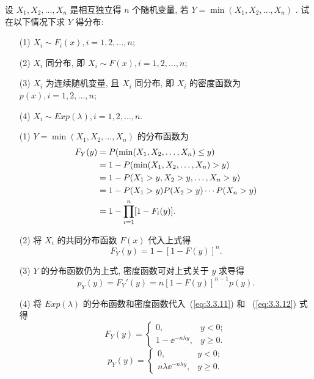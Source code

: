    \begin{example}[最小值分布]\label{exam:3.3.5}
   	设 $X_1,X_2,\ldots,X_n$ 是相互独立得 $n$ 个随机变量, 若 $Y=\min(X_1,X_2,\ldots,X_n)$ . 试在以下情况下求 $Y$ 得分布:
   	\begin{itemize}
   		\item[(1)] $X_i\sim F_i(x),i=1,2,\ldots,n$;
   		\item[(2)] $X_i$ 同分布, 即 $X_i\sim F(x),i=1,2,\ldots,n$;
   		\item[(3)] $X_i$ 为连续随机变量, 且 $X_i$ 同分布, 即 $X_i$ 的密度函数为 $p(x),i=1,2,\ldots,n$;
   		\item[(4)] $X_i\sim Exp(\lambda),i=1,2,\ldots,n$.
   	\end{itemize}
   	\begin{solution}
   		\begin{itemize}
   			\item[(1)] $Y=\min(X_1,X_2,\ldots,X_n)$ 的分布函数为
   			\begin{align}
   				F_Y(y)&=P(\min(X_1,X_2,\ldots,X_n)\leqslant y)\notag\\
   				&=1-P(\min(X_1,X_2,\ldots,X_n)>y)\notag\\
   				&=1-P(X_1>y,X_2>y,\ldots,X_n>y)\notag\\
   				&=1-P(X_1>y)P(X_2>y)\cdots P(X_n>y)\notag\\
   				&=1-\prod_{i=1}^{n}[1-F_i(y)].\label{eq:3.3.10}
   			\end{align}
   			\item[(2)] 将 $X_i$ 的共同分布函数 $F(x)$ 代入上式得
   			\begin{equation}
   				F_Y(y)=1-[1-F(y)]^n.\label{eq:3.3.11}
   			\end{equation}
   			\item[(3)] $Y$ 的分布函数仍为上式, 密度函数可对上式关于 $y$ 求导得
   			\begin{equation}
   				p_Y(y)=F_Y'(y)=n[1-F(y)]^{n-1}p(y).\label{eq:3.3.12}
   			\end{equation}
   			\item[(4)] 将 $Exp(\lambda)$ 的分布函数和密度函数代入~(\ref{eq:3.3.11}) 和 ~(\ref{eq:3.3.12}) 式得
   			\begin{equation*}
   				F_Y(y)=\begin{cases}
   					0, & y<0;\\
   					1-\ee^{-n\lambda y}, & y\geqslant0.
   				\end{cases}
   			\end{equation*}
   			\begin{equation*}
   				p_Y(y)=\begin{cases}
   					0, & y<0;\\
   					n\lambda\ee^{-n\lambda y}, & y\geqslant0.
   				\end{cases}
   			\end{equation*}
   		\end{itemize}
   	\end{solution}
   \end{example}
   
